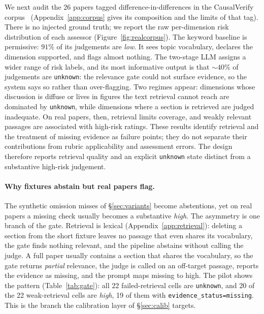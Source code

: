 We next audit the 26 papers tagged difference-in-differences in the
CausalVerify corpus~\cite{causalverify} (Appendix~\ref{app:corpus} gives its
composition and the limits of that tag). There is no
injected ground truth; we report
the raw per-dimension risk distribution of each assessor
(Figure~\ref{fig:realcorpus}). The keyword baseline is permissive: $91\%$ of its
judgements are \emph{low}. It sees topic vocabulary, declares the dimension
supported, and flags almost nothing. The two-stage LLM assigns a wider range of risk labels, and its
most informative output is that ${\sim}40\%$ of judgements are \texttt{unknown}:
the relevance gate could not surface evidence, so the system says so rather than
over-flagging. Two regimes appear: dimensions whose discussion is diffuse or
lives in figures the text retrieval cannot reach are dominated by
\texttt{unknown}, while dimensions where a section is retrieved are judged
inadequate. On real papers, then, retrieval limits coverage, and weakly
relevant passages are associated with high-risk ratings. These results
identify retrieval and the treatment of missing evidence as failure points; they
do not separate their contributions from rubric applicability and assessment
errors. The design therefore reports retrieval quality and an explicit
\texttt{unknown} state distinct from a substantive high-risk judgement.

\paragraph{Why fixtures abstain but real papers flag.}
The synthetic omission misses of \S\ref{sec:variants} become abstentions, yet
on real papers a missing check usually becomes a substantive \emph{high}. The
asymmetry is one branch of the gate. Retrieval is lexical
(Appendix~\ref{app:retrieval}): deleting a section from the short fixture leaves
no passage that even shares its vocabulary, the gate finds nothing relevant, and
the pipeline abstains without calling the judge. A full paper usually
contains a section that shares the vocabulary, so the gate returns
\emph{partial} relevance, the judge is called on an off-target passage, reports
the evidence as missing, and the prompt maps missing to high. The pilot
shows the pattern (Table~\ref{tab:gate}): all 22 failed-retrieval cells are
\texttt{unknown}, and 20 of the 22 weak-retrieval cells are \emph{high}, 19 of
them with \texttt{evidence\_status=missing}. This is the branch the calibration
layer of \S\ref{sec:calib} targets.

